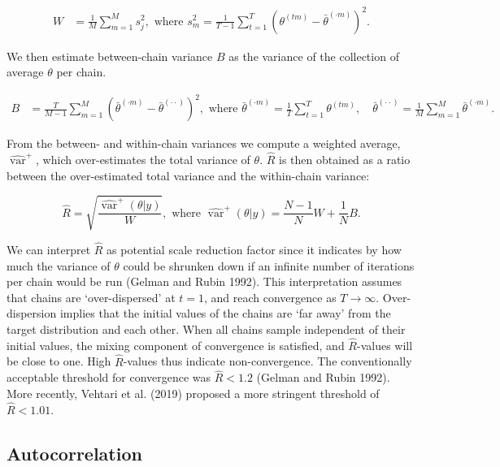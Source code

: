 \documentclass[
  Royal, times, sageapa]{sagej}
\begin{document}
\begin{align*}
W&=\frac{1}{M} \sum_{m=1}^{M} s_{j}^{2},  \text { where } s_{m}^{2}=\frac{1}{T-1} \sum_{t=1}^{T}\left(\theta^{(t m)}-\bar{\theta}^{(\cdot m)}\right)^{2}. 
\end{align*}

We then estimate between-chain variance \(B\) as the variance of the
collection of average \(\theta\) per chain.

\begin{align*}
B&=\frac{T}{M-1} \sum_{m=1}^{M}\left(\bar{\theta}^{(\cdot m)}-\bar{\theta}^{(\cdot \cdot)}\right)^{2}, \text { where } \bar{\theta}^{(\cdot m)}=\frac{1}{T} \sum_{t=1}^{T} \theta^{(t m)}, \quad \bar{\theta}^{(\cdot \cdot)}=\frac{1}{M} \sum_{m=1}^{M} \bar{\theta}^{(\cdot m)}. 
\end{align*}

From the between- and within-chain variances we compute a weighted
average, \(\widehat{\operatorname{var}}^{+}\), which over-estimates the
total variance of \(\theta\). \(\widehat{R}\) is then obtained as a
ratio between the over-estimated total variance and the within-chain
variance:

\begin{equation*}
\widehat{R}=\sqrt{\frac{\widehat{\operatorname{var}}^{+}(\theta | y)}{W}},
\text{ where } \widehat{\operatorname{var}}^{+}(\theta | y)=\frac{N-1}{N} W+\frac{1}{N} B.
\end{equation*}

We can interpret \(\widehat{R}\) as potential scale reduction factor
since it indicates by how much the variance of \(\theta\) could be
shrunken down if an infinite number of iterations per chain would be run
(Gelman and Rubin 1992). This interpretation assumes that chains are
`over-dispersed' at \(t=1\), and reach convergence as \(T \to \infty\).
Over-dispersion implies that the initial values of the chains are `far
away' from the target distribution and each other. When all chains
sample independent of their initial values, the mixing component of
convergence is satisfied, and \(\widehat{R}\)-values will be close to
one. High \(\widehat{R}\)-values thus indicate non-convergence. The
conventionally acceptable threshold for convergence was
\(\widehat{R} < 1.2\) (Gelman and Rubin 1992). More recently, Vehtari et
al. (2019) proposed a more stringent threshold of
\(\widehat{R} < 1.01\).

\hypertarget{autocorrelation}{%
\subsection{Autocorrelation}\label{autocorrelation}}
\end{document}
